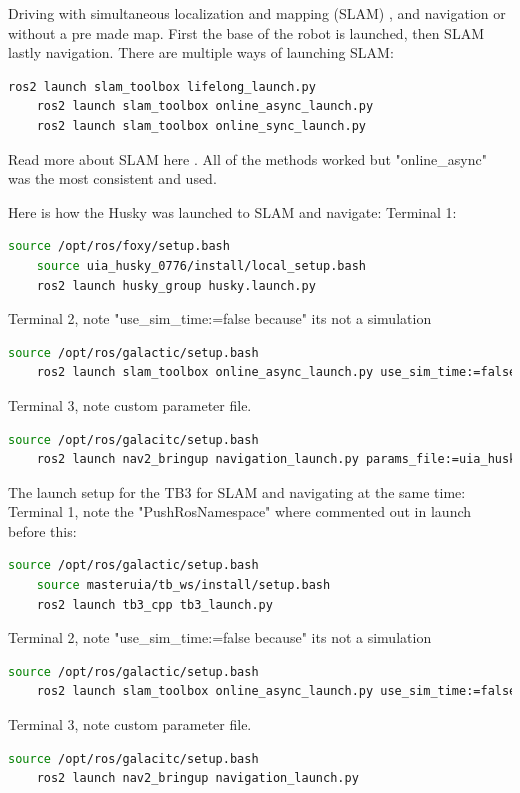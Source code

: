 Driving with simultaneous localization and mapping (SLAM) , and navigation or without a pre made map. First the base of the robot is launched, then SLAM lastly navigation. There are multiple ways of launching SLAM: 
\begin{lstlisting}[language=bash]
    ros2 launch slam_toolbox lifelong_launch.py 
    ros2 launch slam_toolbox online_async_launch.py
    ros2 launch slam_toolbox online_sync_launch.py
\end{lstlisting}
Read more about SLAM here \cite{slamtoolboxgithub}. All of the methods worked but "online\_async" was the most consistent and used. 

Here is how the Husky was launched to SLAM and navigate: 
Terminal 1: 
\begin{lstlisting}[language=bash]
    source /opt/ros/foxy/setup.bash
    source uia_husky_0776/install/local_setup.bash
    ros2 launch husky_group husky.launch.py
\end{lstlisting}
Terminal 2, note "use\_sim\_time:=false because" its not a simulation 
\begin{lstlisting}[language=bash]
    source /opt/ros/galactic/setup.bash
    ros2 launch slam_toolbox online_async_launch.py use_sim_time:=false
\end{lstlisting}
Terminal 3, note custom parameter file. 
\begin{lstlisting}[language=bash]
    source /opt/ros/galacitc/setup.bash
    ros2 launch nav2_bringup navigation_launch.py params_file:=uia_husky_0776/husky_group/params/nav2_params.yaml
\end{lstlisting}

The launch setup for the TB3 for SLAM and navigating at the same time: 
Terminal 1, note the "PushRosNamespace" where commented out in launch before this: 
\begin{lstlisting}[language=bash]
    source /opt/ros/galactic/setup.bash
    source masteruia/tb_ws/install/setup.bash
    ros2 launch tb3_cpp tb3_launch.py
\end{lstlisting}
Terminal 2, note "use\_sim\_time:=false because" its not a simulation 
\begin{lstlisting}[language=bash]
    source /opt/ros/galactic/setup.bash
    ros2 launch slam_toolbox online_async_launch.py use_sim_time:=false
\end{lstlisting}
Terminal 3, note custom parameter file. 
\begin{lstlisting}[language=bash]
    source /opt/ros/galacitc/setup.bash
    ros2 launch nav2_bringup navigation_launch.py 
\end{lstlisting}

